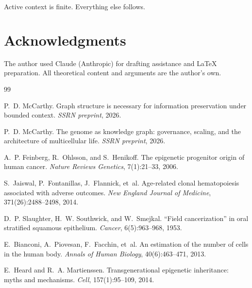 \documentclass[11pt]{article}
\theoremstyle{definition}
\begin{document}
Active context is finite. Everything else follows.

\section*{Acknowledgments}

The author used Claude (Anthropic) for drafting assistance and
\LaTeX{} preparation. All theoretical content and arguments are the
author's own.


\begin{thebibliography}{99}

P.~D. McCarthy.
\newblock Graph structure is necessary for information preservation
under bounded context.
\newblock \emph{SSRN preprint}, 2026.

P.~D. McCarthy.
\newblock The genome as knowledge graph: governance, scaling, and the
architecture of multicellular life.
\newblock \emph{SSRN preprint}, 2026.

A.~P. Feinberg, R.~Ohlsson, and S.~Henikoff.
\newblock The epigenetic progenitor origin of human cancer.
\newblock \emph{Nature Reviews Genetics}, 7(1):21--33, 2006.

S.~Jaiswal, P.~Fontanillas, J.~Flannick, et~al.
\newblock Age-related clonal hematopoiesis associated with adverse
outcomes.
\newblock \emph{New England Journal of Medicine}, 371(26):2488--2498, 2014.

D.~P. Slaughter, H.~W. Southwick, and W.~Smejkal.
\newblock ``Field cancerization'' in oral stratified squamous epithelium.
\newblock \emph{Cancer}, 6(5):963--968, 1953.

E.~Bianconi, A.~Piovesan, F.~Facchin, et~al.
\newblock An estimation of the number of cells in the human body.
\newblock \emph{Annals of Human Biology}, 40(6):463--471, 2013.

E.~Heard and R.~A. Martienssen.
\newblock Transgenerational epigenetic inheritance: myths and mechanisms.
\newblock \emph{Cell}, 157(1):95--109, 2014.

\end{thebibliography}
\end{document}
